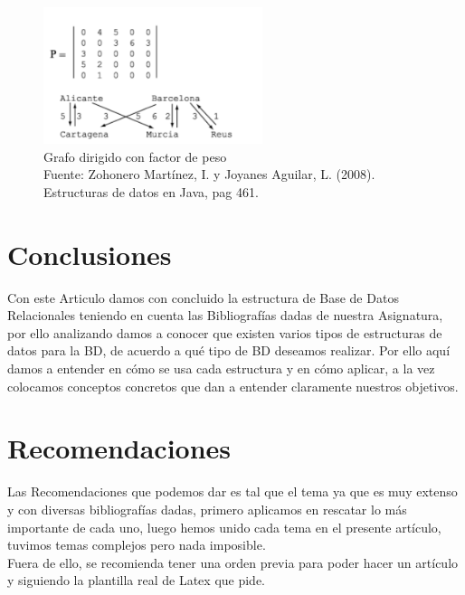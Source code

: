 \documentclass{article}
\begin{document}
\begin{figure}[ht]
    \centering     
    \includegraphics[height=4cm]{images/figura12.png}
    \caption{Grafo dirigido con factor de peso\\Fuente: Zohonero Martínez,  I. y Joyanes Aguilar, L. (2008). Estructuras de datos en Java, pag 461.}
    \label{fig:BiasVoltager}
    
\end{figure}
\section{Conclusiones}
Con este Articulo damos con concluido la estructura de Base de Datos Relacionales teniendo en cuenta las Bibliografías dadas de nuestra Asignatura, por ello analizando damos a conocer que existen varios tipos de estructuras de datos  para la BD, de acuerdo a qué tipo de BD deseamos realizar. Por ello aquí damos a entender en cómo se usa cada estructura y en cómo aplicar, a la vez colocamos conceptos concretos que dan a entender claramente nuestros objetivos.
\section{Recomendaciones}
Las Recomendaciones que podemos dar es tal que el tema ya que es muy extenso y con diversas bibliografías dadas, primero aplicamos en rescatar lo más importante de cada uno, luego hemos unido cada tema en el presente artículo, tuvimos temas complejos pero nada imposible.\\Fuera de ello, se recomienda tener una orden previa para poder hacer un artículo y siguiendo la plantilla real de Latex que pide. 


\end{document}
